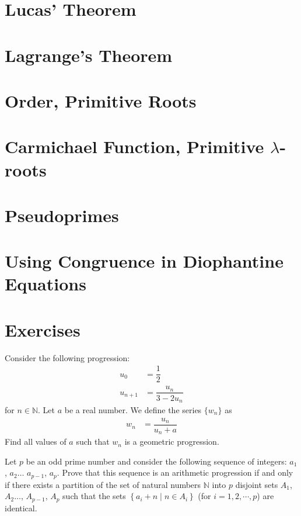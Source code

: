 \documentclass{subfile}
\begin{document}
	\section{Lucas' Theorem}
		
	\section{Lagrange's Theorem}
		
	\section{Order, Primitive Roots} \label{sec:order}
		
	\section{Carmichael Function, Primitive \texorpdfstring{$\lambda$}{L}-roots}
		
	\section{Pseudoprimes} \label{sec:pseudoprimes}
		
	\section{Using Congruence in Diophantine Equations}
		

		\newpage
		\section{Exercises}

	\begin{problem} %
		Consider the following progression:
			\begin{align*}
				u_0 &= \dfrac{1}{2}\\
				u_{n+1} &= \dfrac{u_n}{3-2u_n}
			\end{align*}
		for $n\in\mathbb{N}$. Let $a$ be a real number. We define the series $\{w_n\}$ as
			\begin{align*}
				w_n &= \dfrac{u_n}{u_n + a}
			\end{align*}
		Find all values of $a$ such that $w_n$ is a geometric progression.
	\end{problem}

	\begin{problem} %
		Let $p$ be an odd prime number and consider the following sequence of integers: $a_1$, $a_2\ldots$ $a_{p-1}$, $a_p$. Prove that this sequence is an arithmetic progression if and only if there exists a partition of the set of natural numbers $\mathbb{N}$ into $p$ disjoint sets $A_1$, $A_2\ldots$, $A_{p-1}$, $A_p$ such that the sets $\left\{ a_i+n\mid n\in A_i\right\}$ (for $i=1, 2,\cdots, p$) are identical.
	\end{problem}
\end{document}
